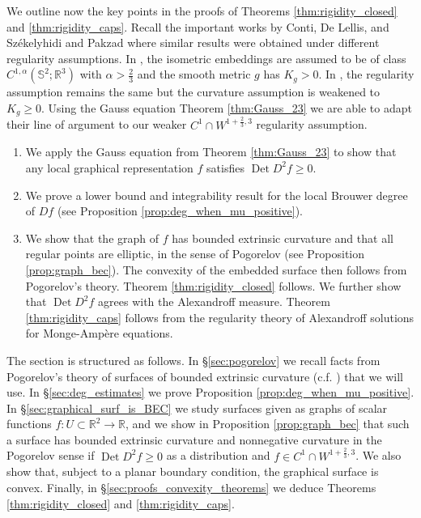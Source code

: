 \documentclass[12pt]{article}
\newcommand{\R}{\mathbb{R}}
\newcommand{\Det}{\operatorname{Det}}
\theoremstyle{plain}
\numberwithin{equation}{section}
\begin{document}
We outline now the key points in the proofs of Theorems \ref{thm:rigidity_closed} and \ref{thm:rigidity_caps}. Recall the important works by Conti, De Lellis, and Székelyhidi \cite{conti_deLellis_szekelyhidi_12} and Pakzad \cite{pakzad_24} where similar results were obtained under different regularity assumptions. In \cite{conti_deLellis_szekelyhidi_12}, the isometric embeddings are assumed to be of class $C^{1,\alpha}(\mathbb{S}^2;\R^3)$ with $\alpha > \frac23$ and the smooth metric $g$ has $K_g > 0$. In \cite{pakzad_24}, the regularity assumption remains the same but the curvature assumption is weakened to $K_g \geq 0$. Using the Gauss equation Theorem \ref{thm:Gauss_23} we are able to adapt their line of argument to our weaker $C^1 \cap W^{1+\frac23,3}$ regularity assumption.
\begin{enumerate}
    \item We apply the Gauss equation from Theorem \ref{thm:Gauss_23} to show that any local graphical representation $f$ satisfies $\Det D^2 f \geq 0$.
    \item We prove a lower bound and integrability result for the local Brouwer degree of $Df$ (see Proposition \ref{prop:deg_when_mu_positive}).
    \item We show that the graph of $f$ has bounded extrinsic curvature and that all regular points are elliptic, in the sense of Pogorelov (see Proposition \ref{prop:graph_bec}). The convexity of the embedded surface then follows from Pogorelov's theory. Theorem \ref{thm:rigidity_closed} follows. We further show that $\Det D^2f$ agrees with the Alexandroff measure. Theorem \ref{thm:rigidity_caps} follows from the regularity theory of Alexandroff solutions for Monge-Ampère equations.
\end{enumerate}

The section is structured as follows. In \S \ref{sec:pogorelov} we recall facts from Pogorelov's theory of surfaces of bounded extrinsic curvature (c.f. \cite{pogorelov_73}) that we will use. In \S \ref{sec:deg_estimates} we prove Proposition \ref{prop:deg_when_mu_positive}. In \S \ref{sec:graphical_surf_is_BEC} we study surfaces given as graphs of scalar functions $f: U \subset \R^2 \to \R$, and we show in Proposition \ref{prop:graph_bec} that such a surface has bounded extrinsic curvature and nonnegative curvature in the Pogorelov sense if $\Det D^2f \geq 0$ as a distribution and $f \in C^1 \cap W^{1+\frac23,3}$. We also show that, subject to a planar boundary condition, the graphical surface is convex. Finally, in \S \ref{sec:proofs_convexity_theorems} we deduce Theorems \ref{thm:rigidity_closed} and \ref{thm:rigidity_caps}.
\end{document}
